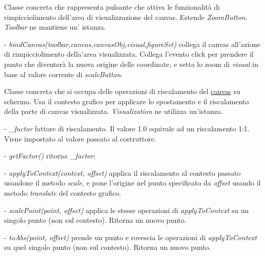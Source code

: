 Classe concreta che rappresenta pulsante che attiva le funzionalit\` a di rimpicciolimento dell'area di visualizzazione del canvas.
Estende \textit{ZoomButton}.
\textit{Toolbar} ne mantiene un' istanza.
\begin{elencopuntato}[\subsubsecindent]
\item[-] \textit{bindCanvas(toolbar,canvas,canvasObj,visual,figureSet)} collega il canvas all'azione di rimpicciolimento della'area visualizzata. Collega l'evento click per prendere il punto che diventer\`a la nuova origine delle coordinate, e setta lo zoom di \textit{visual} in base al valore corrente di \textit{scaleButton}.
\end{elencopuntato}

Classe concreta che si occupa delle operazioni di riscalamento del \underline{canvas} su schermo. 
Usa il contesto grafico per applicare lo spostamento e il riscalamento della parte di canvas visualizzata.
\textit{Visualization} ne utilizza un'istanza.
\begin{elencopuntato}[\subsubsecindent]
\item[-] \textit{{\_}factor} fattore di riscalamento. Il valore 1.0 equivale ad un riscalamento 1:1. Viene impostato al valore passato al costruttore.
\end{elencopuntato}
\begin{elencopuntato}[\subsubsecindent]
\item[-] \textit{getFactor()} ritorna \textit{{\_}factor};
\item[-] \textit{applyToContext(context, offset)} applica il riscalamento al contesto passato usandone il metodo \textit{scale}, e pone l'origine nel punto specificato da \textit{offset} usando il metodo \textit{translate} del contesto grafico.
\item[-] \textit{scalePoint(point, offset)} applica le stesse operazioni di \textit{applyToContext} su un singolo punto (non sul contesto). Ritorna un nuovo punto.
\item[-] \textit{toAbs(point, offset)} prende un punto e rovescia le operazioni di \textit{applyToContext} su quel singolo punto (non sul contesto). Ritorna un nuovo punto.
\end{elencopuntato}

